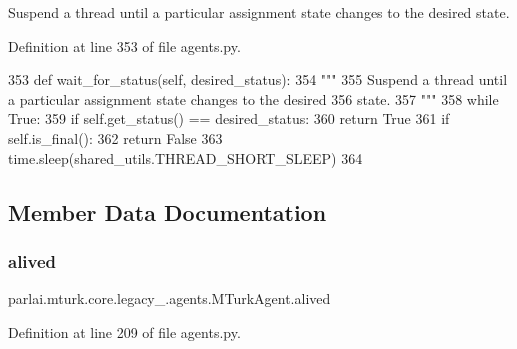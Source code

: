 \begin{DoxyVerb}Suspend a thread until a particular assignment state changes to the desired
state.
\end{DoxyVerb}
 

Definition at line 353 of file agents.\+py.


\begin{DoxyCode}
353     \textcolor{keyword}{def }wait\_for\_status(self, desired\_status):
354         \textcolor{stringliteral}{"""}
355 \textcolor{stringliteral}{        Suspend a thread until a particular assignment state changes to the desired}
356 \textcolor{stringliteral}{        state.}
357 \textcolor{stringliteral}{        """}
358         \textcolor{keywordflow}{while} \textcolor{keyword}{True}:
359             \textcolor{keywordflow}{if} self.get\_status() == desired\_status:
360                 \textcolor{keywordflow}{return} \textcolor{keyword}{True}
361             \textcolor{keywordflow}{if} self.is\_final():
362                 \textcolor{keywordflow}{return} \textcolor{keyword}{False}
363             time.sleep(shared\_utils.THREAD\_SHORT\_SLEEP)
364 
\end{DoxyCode}


\subsection{Member Data Documentation}
\mbox{\label{classparlai_1_1mturk_1_1core_1_1legacy__2018_1_1agents_1_1MTurkAgent_ac3bed73155cdacd1bc5de1d32075e4ae}} 
\subsubsection{\texorpdfstring{alived}{alived}}
{\footnotesize\ttfamily parlai.\+mturk.\+core.\+legacy\+\_.\+agents.\+M\+Turk\+Agent.\+alived}



Definition at line 209 of file agents.\+py.

\mbox{\label{classparlai_1_1mturk_1_1core_1_1legacy__2018_1_1agents_1_1MTurkAgent_a2590f192e9c2e29f01fdbddca0618a1c}} 
